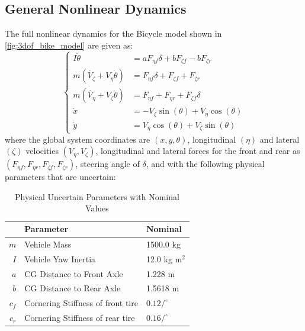 \documentclass[conference, onecolumn]{IEEEtran}
\begin{document}
\subsection{General Nonlinear Dynamics}
The full nonlinear dynamics for the Bicycle model shown in \figurename{\ref{fig:3dof_bike_model}} are given as: \begin{equation}\begin{cases}
    I \ddot{\theta}     &= a F_{\eta f} \delta + b F_{\zeta f} - b F_{\zeta r}\\
    m (\dot{V_{\zeta}} + V_\eta \dot{\theta}) &= F_{\eta f} \delta + F_{\zeta f} + F_{\zeta r}\\
    m(\dot{V_{\eta}} + V_\zeta \dot{\theta}) &= F_{\eta f} + F_{\eta r} + F_{\zeta f} \delta\\
    \dot{x} &= -V_{\zeta} \sin(\theta) + V_{\eta} \cos(\theta)\\
    \dot{y} &= V_{\eta} \cos(\theta) + V_{\zeta} \sin(\theta)
\end{cases}\label{eq:full_nonlin_eq}\end{equation}
where the global system coordinates are $(x, y, \theta)$, 
longitudinal $(\eta)$ and lateral $(\zeta)$ velocities $(V_\eta, V_\zeta)$,
longitudinal and lateral forces for the front and rear as $(F_{\eta f},F_{\eta r},F_{\zeta f},F_{\zeta r})$,
steering angle of $\delta$, 
and with the following physical parameters that are uncertain:

\begin{table}[h] \label{tbl:parameters}
    \centering
    \caption{Physical Uncertain Parameters with Nominal Values}
    \begin{tabular}{|r|l|l|}
        \hline
            & Parameter & Nominal\\
        \hline
        $m$ & Vehicle Mass & 1500.0 kg\\
        \hline
        $I$ & Vehicle Yaw Inertia & 12.0 kg m$^2$\\
        \hline
        $a$ & CG Distance to Front Axle & 1.228 m\\
        \hline
        $b$ & CG Distance to Rear Axle & 1.5618 m\\
        \hline
        $c_f$ & Cornering Stiffness of front tire & $0.12 / ^\circ$\\
        \hline
        $c_r$ & Cornering Stiffness of rear tire & $0.16 / ^\circ$\\
        \hline
    \end{tabular}
\end{table}
\end{document}
